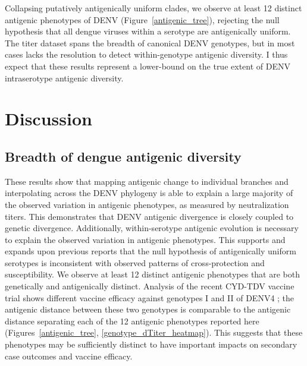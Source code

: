 Collapsing putatively antigenically uniform clades, we observe at least 12 distinct antigenic phenotypes of DENV (Figure~\ref{antigenic_tree}), rejecting the null hypothesis that all dengue viruses within a serotype are antigenically uniform.
The titer dataset spans the breadth of canonical DENV genotypes, but in most cases lacks the resolution to detect within-genotype antigenic diversity.
I thus expect that these results represent a lower-bound on the true extent of DENV intraserotype antigenic diversity.


\section{Discussion}
\subsection{Breadth of dengue antigenic diversity}
These results show that mapping antigenic change to individual branches and interpolating across the DENV phylogeny is able to explain a large majority of the observed variation in antigenic phenotypes, as measured by neutralization titers.
This demonstrates that DENV antigenic divergence is closely coupled to genetic divergence.
Additionally, within-serotype antigenic evolution is necessary to explain the observed variation in antigenic phenotypes.
This supports and expands upon previous reports \citep{katzelnick2015dengue} that the null hypothesis of antigenically uniform serotypes is inconsistent with observed patterns of cross-protection and susceptibility.
We observe at least 12 distinct antigenic phenotypes that are both genetically and antigenically distinct.
Analysis of the recent CYD-TDV vaccine trial shows different vaccine efficacy against genotypes I and II of DENV4 \citep{juraska2018viral}; the antigenic distance between these two genotypes is comparable to the antigenic distance separating each of the 12 antigenic phenotypes reported here  (Figures~\ref{antigenic_tree}, \ref{genotype_dTiter_heatmap}).
This suggests that these phenotypes may be sufficiently distinct to have important impacts on secondary case outcomes and vaccine efficacy.

